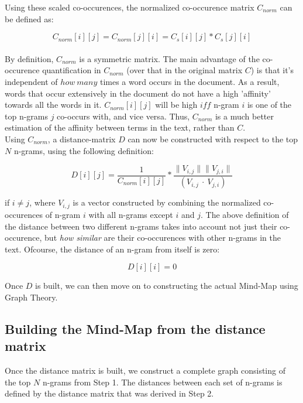 \documentclass[11pt]{article}
\begin{document}
Using these scaled co-occurences, the normalized co-occurence matrix $C_{norm}$ can be defined as:

\begin{equation}
C_{norm}[i][j] = C_{norm}[j][i] = C_s[i][j]*C_s[j][i]
\end{equation}\\

By definition, $C_{norm}$ is a symmetric matrix. The main advantage of the co-occurence quantification in $C_{norm}$ (over that in the original matrix $C$) is that it's independent of $how\ many$ times a word occurs in the document. As a result, words that occur extensively in the document do not have a high 'affinity' towards all the words in it. $C_{norm}[i][j]$ will be high $iff$ n-gram $i$ is one of the top n-grams $j$ co-occurs with, and vice versa. Thus, $C_{norm}$ is a much better estimation of the affinity between terms in the text, rather than $C$.\\

Using $C_{norm}$, a distance-matrix $D$ can now be constructed with respect to the top $N$ n-grams, using the following definition:

\begin{equation}
D[i][j] = \frac{1}{C_{norm}[i][j]} * \frac{\|V_{i, j} \| \| V_{j, i} \|}{(V_{i, j} \ \cdot \ V_{j, i})} 
\end{equation}

if $i \ne j$, where $V_{i, j}$ is a vector constructed by combining the normalized co-occurences of n-gram $i$ with all n-grams except $i$ and $j$. The above definition of the distance between two different n-grams takes into account not just their co-occurence, but \textit{how similar} are their co-occurences with other n-grams in the text. Ofcourse, the distance of an n-gram from itself is zero:

\begin{equation}
D[i][i] = 0
\end{equation}

Once $D$ is built, we can then move on to constructing the actual Mind-Map using Graph Theory.

\subsection{Building the Mind-Map from the distance matrix}

Once the distance matrix is built, we construct a complete graph consisting of the top $N$ n-grams from Step 1. The distances between each set of n-grams is defined by the distance matrix that was derived in Step 2.\\
\end{document}
